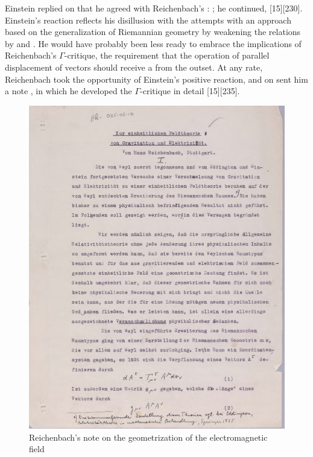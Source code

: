 \documentclass[final]{article}
\begin{document}
Einstein replied on   that he agreed with Reichenbach's : ;  he continued,  [15][230]. Einstein's reaction reflects his disillusion with the attempts with an approach based on the generalization of Riemannian geometry by weakening the relations by \gmn and \Gtmn. He would have probably been less ready to embrace the implications of Reichenbach's $\Gamma$-critique, the requirement that the operation of parallel displacement of vectors should receive a  from the outset. At any rate, Reichenbach took the opportunity of Einstein's positive reaction, and on  sent him a note \citep{Reichenbach1926f},  in which he developed the $\Gamma$-critique in detail [15][235].

\begin{figure}
\begin{center}
 \includegraphics[scale=0.4, trim = 0mm 0mm 0mm 0mm, clip]{1926ReichenbachNote}
 \caption{Reichenbach's note on the geometrization of the electromagnetic field}
\end{center}
\end{figure}
\end{document}
